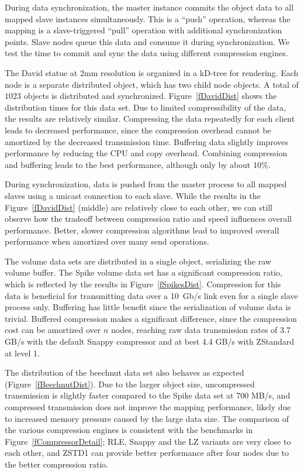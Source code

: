 \documentclass[10pt,journal,compsoc]{IEEEtran}
\newcommand{\fig}[1]{Figure~\ref{#1}}
\begin{document}
During data synchronization, the master instance commits the object data to all
mapped slave instances simultaneously. This is a ``push'' operation, whereas the
mapping is a slave-triggered ``pull'' operation with additional synchronization
points. Slave nodes queue this data and consume it during synchronization. We
test the time to commit and sync the data using different compression engines.


The David statue at 2mm resolution is organized in a kD-tree for rendering. Each
node is a separate distributed object, which has two child node objects. A
total of $1023$ objects is distributed and synchronized. \fig{fDavidDist} shows
the distribution times for this data set. Due to limited compressibility of the
data, the results are relatively similar. Compressing the data repeatedly for
each client leads to decreased performance, since the compression overhead
cannot be amortized by the decreased transmission time. Buffering data slightly
improves performance by reducing the CPU and copy overhead. Combining
compression and buffering leads to the best performance, although only by about
10\%.

During synchronization, data is pushed from the master process to all mapped
slaves using a unicast connection to each slave. While the results in the
\fig{fDavidDist} (middle) are relatively close to each other, we can still
observe how the tradeoff between compression ratio and speed influences overall
performance. Better, slower compression algorithms lead to improved overall
performance when amortized over many send operations.

The volume data sets are distributed in a single object, serializing the raw
volume buffer. The Spike volume data set has a significant compression ratio,
which is reflected by the results in \fig{fSpikesDist}. Compression for this
data is beneficial for transmitting data over a 10~Gb/s link even for a single
slave process only. Buffering has little benefit since the serialization of
volume data is trivial. Buffered compression makes a significant difference,
since the compression cost can be amortized over $n$ nodes, reaching raw data
transmission rates of 3.7 GB/s with the default Snappy compressor and at best
4.4 GB/s with ZStandard at level 1.

The distribution of the beechnut data set also behaves as expected
(\fig{fBeechnutDist}). Due to the larger object size, uncompressed transmission
is slightly faster compared to the Spike data set at 700 MB/s, and compressed
transmission does not improve the mapping performance, likely due to increased
memory pressure caused by the large data size. The comparison of the various
compression engines is consistent with the benchmarks in
\fig{fCompressorDetail}; RLE, Snappy and the LZ variants are very close to each
other, and ZSTD1 can provide better performance after four nodes due to the
better compression ratio.
\end{document}

